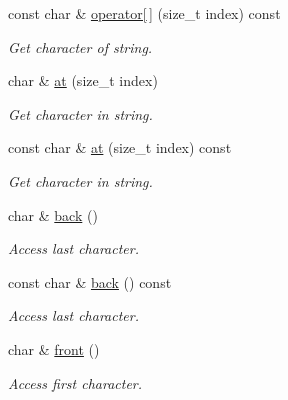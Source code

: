 \begin{DoxyCompactItemize}
\mbox{\label{class_string_a433ce8bc2e88d07f1865419fbf770ca5}} 
const char \& \hyperlink{class_string_a433ce8bc2e88d07f1865419fbf770ca5}{operator\mbox{[}$\,$\mbox{]}} (size\+\_\+t index) const
\begin{DoxyCompactList}\small\item\em Get character of string. \end{DoxyCompactList}\item 
\mbox{\label{class_string_a9c2c3075f6a490ef112e7f83e6cde351}} 
char \& \hyperlink{class_string_a9c2c3075f6a490ef112e7f83e6cde351}{at} (size\+\_\+t index)
\begin{DoxyCompactList}\small\item\em Get character in string. \end{DoxyCompactList}\item 
\mbox{\label{class_string_a3b3b3427a4a75888ee3812ea107fb9c6}} 
const char \& \hyperlink{class_string_a3b3b3427a4a75888ee3812ea107fb9c6}{at} (size\+\_\+t index) const
\begin{DoxyCompactList}\small\item\em Get character in string. \end{DoxyCompactList}\item 
\mbox{\label{class_string_abb80e1189595b12b7466d7e38bde3b7c}} 
char \& \hyperlink{class_string_abb80e1189595b12b7466d7e38bde3b7c}{back} ()
\begin{DoxyCompactList}\small\item\em Access last character. \end{DoxyCompactList}\item 
\mbox{\label{class_string_ac7c01a0e930f9381db72a879ddf05df2}} 
const char \& \hyperlink{class_string_ac7c01a0e930f9381db72a879ddf05df2}{back} () const
\begin{DoxyCompactList}\small\item\em Access last character. \end{DoxyCompactList}\item 
\mbox{\label{class_string_ae5c8caa50e19cea1e6ac6e1666e7f5bd}} 
char \& \hyperlink{class_string_ae5c8caa50e19cea1e6ac6e1666e7f5bd}{front} ()
\begin{DoxyCompactList}\small\item\em Access first character. \end{DoxyCompactList}\item 

\end{DoxyCompactItemize}
